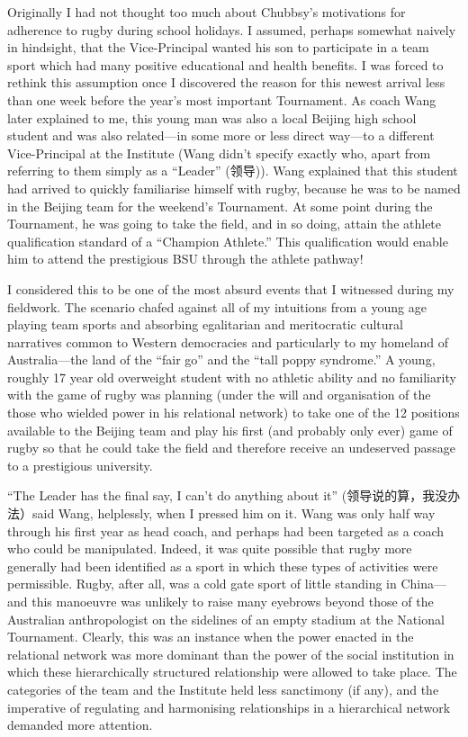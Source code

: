 \begin{CJK}{UTF8}{gbsn}
Originally I had not thought too much about Chubbsy's motivations for adherence to rugby during school holidays.  I assumed, perhaps somewhat naively in hindsight, that the Vice-Principal wanted his son to participate in a team sport which had many positive educational and health benefits.  I was forced to rethink this assumption once I discovered the reason for this newest arrival less than one week before the year's most important Tournament.  As coach Wang later explained to me, this young man was also a local Beijing high school student and was also related---in some more or less direct way---to a different Vice-Principal at the Institute (Wang didn't specify exactly who, apart from referring to them simply as a ``Leader'' (领导)). Wang explained that this student had arrived to quickly familiarise himself with rugby, because he was to be named in the Beijing team for the weekend's Tournament.  At some point during the Tournament, he was going to take the field, and in so doing, attain the athlete qualification standard of a ``Champion Athlete.''  This qualification would enable him to attend the prestigious BSU through the athlete pathway!

I considered this to be one of the most absurd events that I witnessed during my fieldwork.  The scenario chafed against all of my intuitions from a young age playing team sports and absorbing egalitarian and meritocratic cultural narratives common to Western democracies and particularly to my homeland of Australia---the land of the ``fair go'' and the ``tall poppy syndrome.''  A young, roughly 17 year old overweight student with no athletic ability and no familiarity with the game of rugby was planning (under the will and organisation of the those who wielded power in his relational network) to take one of the 12 positions available to the Beijing team and play his first (and probably only ever) game of rugby so that he could take the field and therefore receive an undeserved passage to a prestigious university.

``The Leader has the final say, I can't do anything about it'' (领导说的算，我没办法）said Wang, helplessly, when I pressed him on it.  Wang was only half way through his first year as head coach, and perhaps had been targeted as a coach who could be manipulated.  Indeed, it was quite possible that rugby more generally had been identified as a sport in which these types of activities were permissible.  Rugby, after all, was a cold gate sport of little standing in China---and this manoeuvre was unlikely to raise many eyebrows beyond those of the Australian anthropologist on the sidelines of an empty stadium at the National Tournament.  Clearly, this was an instance when the power enacted in the relational network was more dominant than the power of the social institution in which these hierarchically structured relationship were allowed to take place.  The categories of the team and the Institute held less sanctimony (if any), and the imperative of regulating and harmonising relationships in a hierarchical network demanded more attention.


\end{CJK}
